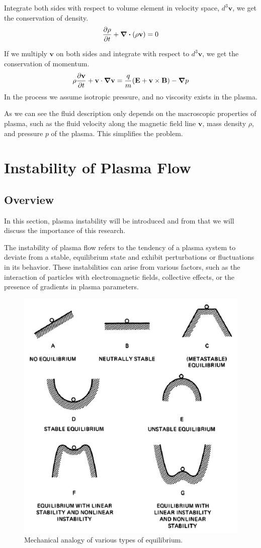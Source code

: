 Integrate both sides with respect to volume element in velocity space, $d^3\mathbf{v}$, we get the conservation of density.
\[ \pdv{\rho}{t} + \div(\rho\mathbf{v}) = 0 \]

If we multiply $\mathbf{v}$ on both sides and integrate with respect to $d^3\mathbf{v}$, we get the conservation of momentum.
\[ \rho\pdv{\mathbf{v}}{t} + \mathbf{v}\cdot\grad{\mathbf{v}} = \frac{q}{m}(\mathbf{E+v\times B}) - \grad{p} \]
In the process we assume isotropic pressure, and no viscosity exists in the plasma.

As we can see the fluid description only depends on the macroscopic properties of plasma, such as the fluid velocity along the magnetic field line $\mathbf{v}$, mass density $\rho$, and pressure $p$ of the plasma. This simplifies the problem.

\section{Instability of Plasma Flow}
\subsection{Overview}
In this section, plasma instability will be introduced and from that we will discuss the importance of this research.

The instability of plasma flow refers to the tendency of a plasma system to deviate from a stable, equilibrium state and exhibit perturbations or fluctuations in its behavior. These instabilities can arise from various factors, such as the interaction of particles with electromagnetic fields, collective effects, or the presence of gradients in plasma parameters.

\begin{figure}[htbp]
	\centering
	\includegraphics[width=0.7\linewidth]{img/stability-visualization}
	\caption{Mechanical analogy of various types of equilibrium. \cite{chen_introduction_2016}}
	\label{fig:stability-visualization}
\end{figure}

